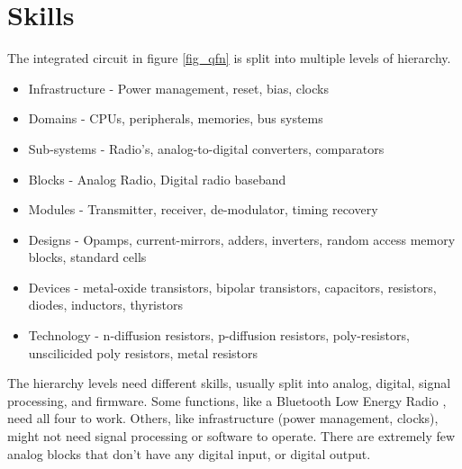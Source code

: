 \documentclass[technote,10pt,a4paper]{IEEEtran}
\begin{document}
\section{Skills}
The integrated circuit in figure \ref{fig_qfn} is split into multiple levels of
hierarchy.

\begin{itemize}
  \item Infrastructure - Power management, reset, bias, clocks
  \item Domains - CPUs, peripherals, memories, bus systems
  \item Sub-systems - Radio's, analog-to-digital converters, comparators
  \item Blocks - Analog Radio, Digital radio baseband
  \item Modules - Transmitter, receiver, de-modulator, timing recovery
  \item Designs - Opamps, current-mirrors, adders, inverters, random access
        memory blocks, standard cells
  \item Devices - metal-oxide transistors, bipolar transistors, capacitors,
        resistors, diodes, inductors, thyristors
  \item Technology - n-diffusion resistors, p-diffusion resistors,
        poly-resistors, unscilicided poly resistors, metal resistors
\end{itemize}

The hierarchy levels need different skills, usually split into
analog, digital, signal processing, and firmware. Some functions, like a Bluetooth Low Energy Radio
, need all four to work. Others, like
infrastructure (power management, clocks), might not need signal processing or
software to operate.
There are extremely few analog blocks that don't have any digital input, or
digital output.

\end{document}
